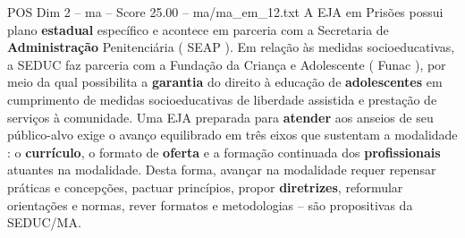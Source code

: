 \begin{textsample}{POS Dim 2 – ma – Score 25.00 – ma/ma\_em\_12.txt}
A EJA em Prisões possui plano \textbf{estadual} específico e acontece em parceria com a Secretaria de \textbf{Administração} Penitenciária ( SEAP ).
Em relação às medidas socioeducativas, a SEDUC faz parceria com a Fundação da Criança e Adolescente ( Funac ), por meio da qual possibilita a \textbf{garantia} do direito à educação de \textbf{adolescentes} em cumprimento de medidas socioeducativas de liberdade assistida e prestação de serviços à comunidade.
Uma EJA preparada para \textbf{atender} aos anseios de seu público-alvo exige o avanço equilibrado em três eixos que sustentam a modalidade : o \textbf{currículo}, o formato de \textbf{oferta} e a formação continuada dos \textbf{profissionais} atuantes na modalidade.
Desta forma, avançar na modalidade requer repensar práticas e concepções, pactuar princípios, propor \textbf{diretrizes}, reformular orientações e normas, rever formatos e metodologias – são propositivas da SEDUC/MA.

\end{textsample}
